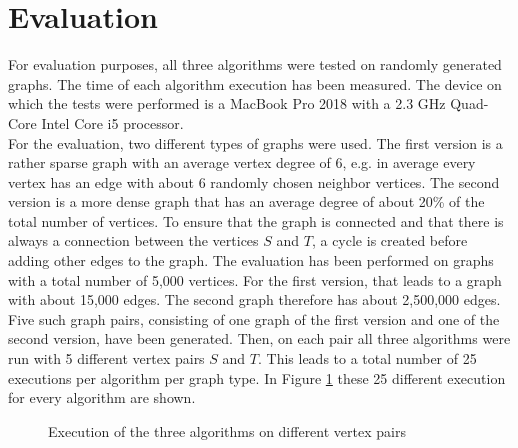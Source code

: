 \documentclass{article}
\begin{document}
\section{Evaluation}
For evaluation purposes, all three algorithms were tested on randomly generated graphs. The time of each algorithm execution has been measured. The device on which the tests were performed is a MacBook Pro 2018 with a 2.3 GHz Quad-Core Intel Core i5 processor.\\
For the evaluation, two different types of graphs were used. The first version is a rather sparse graph with an average vertex degree of 6, e.g. in average every vertex has an edge with about 6 randomly chosen neighbor vertices. The second version is a more dense graph that has an average degree of about 20\% of the total number of vertices. To ensure that the graph is connected and that there is always a connection between the vertices $S$ and $T$, a cycle is created before adding other edges to the graph.
The evaluation has been performed on graphs with a total number of 5,000 vertices. For the first version, that leads to a graph with about 15,000 edges. The second graph therefore has about 2,500,000 edges. Five such graph pairs, consisting of one graph of the first version and one of the second version, have been generated. Then, on each pair all three algorithms were run with 5 different vertex pairs $S$ and $T$. This leads to a total number of 25 executions per algorithm per graph type. In Figure \ref{fig:execution_curves} these 25 different execution for every algorithm are shown.

\begin{figure}[h]
\centering
{}
\caption{Execution of the three algorithms on different vertex pairs}
\label{fig:execution_curves}
\end{figure}
\ \\
\end{document}
